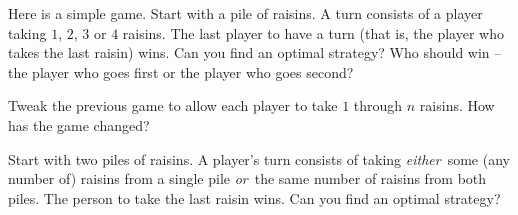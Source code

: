 \documentclass[12pt,letterpaper]{article}
\begin{document}
\thispagestyle{fancy}

\begin{enumerate}
  \Problem Here is a simple game.  Start with a pile of raisins.  A
  turn consists of a player taking $1$, $2$, $3$ or $4$ raisins.  The
  last player to have a turn (that is, the player who takes the last
  raisin) wins.  Can you find an optimal strategy?  Who should win --
  the player who goes first or the player who goes second?
  \vfill

  \Problem
  Tweak the previous game to allow each player to take $1$ through $n$
  raisins.  How has the game changed?
  \vfill

  \Problem\label{prob:2piles}%
  Start with two piles of raisins.  A player's turn consists of taking
  \emph{either}\ some (any number of) raisins from a single pile
  \emph{or}\ the same number of raisins from both piles.  The person
  to take the last raisin wins.  Can you find an optimal strategy?
  \vfill
  \newpage



%
%
%

\end{enumerate}
\end{document}
